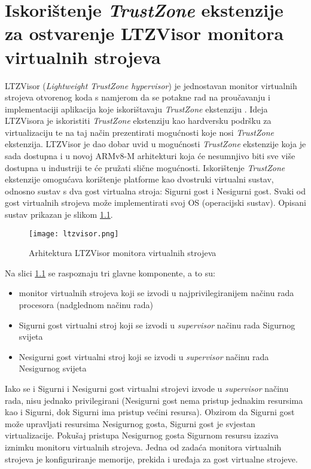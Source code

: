 \documentclass[times, utf8, diplomski, numeric]{fer}
\begin{document}
\chapter{Iskorištenje \textit{TrustZone} ekstenzije za ostvarenje LTZVisor monitora virtualnih strojeva}
LTZVisor (\textit{Lightweight TrustZone hypervisor}) je jednostavan monitor virtualnih strojeva otvorenog koda s namjerom
da se potakne rad na proučavanju i implementaciji aplikacija koje iskorištavaju \textit{TrustZone} ekstenziju \cite{ltzvisor}.
Ideja LTZVisora je iskoristiti \textit{TrustZone} ekstenziju kao hardversku podršku za virtualizaciju te na taj način
prezentirati mogućnosti koje nosi \textit{TrustZone} ekstenzija. LTZVisor je dao dobar uvid u mogućnosti \textit{TrustZone}
ekstenzije koja je sada dostupna i u novoj ARMv8-M arhitekturi koja će nesumnjivo biti sve više dostupna u industriji te
će pružati slične mogućnosti. Iskorištenje \textit{TrustZone} ekstenzije omogućava korištenje platforme kao dvostruki virtualni
sustav, odnosno sustav s dva gost virtualna stroja: Sigurni gost i Nesigurni gost. Svaki od gost virtualnih strojeva može
implementirati svoj OS (operacijski sustav). Opisani sustav prikazan je slikom \ref{ltzvisor}.
\begin{figure}[H]
  \centering
	\texttt{[image: ltzvisor.png]}%
	\caption{Arhitektura LTZVisor monitora virtualnih strojeva \cite{ltzvisor}}
	\label{ltzvisor}%
\end{figure}
Na slici \ref{ltzvisor} se raspoznaju tri glavne komponente, a to su:
\begin{itemize}
  \item{monitor virtualnih strojeva koji se izvodi u najprivilegiranijem načinu rada procesora (nadglednom načinu rada)}
  \item{Sigurni gost virtualni stroj koji se izvodi u \textit{supervisor} načinu rada Sigurnog svijeta}
  \item{Nesigurni gost virtualni stroj koji se izvodi u \textit{supervisor} načinu rada Nesigurnog svijeta}
\end{itemize}
Iako se i Sigurni i Nesigurni gost virtualni strojevi izvode u \textit{supervisor} načinu rada, nisu jednako privilegirani
(Nesigurni gost nema pristup jednakim resursima kao i Sigurni, dok Sigurni ima pristup većini resursa). Obzirom da
Sigurni gost može upravljati resursima Nesigurnog gosta, Sigurni gost je svjestan virtualizacije. Pokušaj pristupa Nesigurnog
gosta Sigurnom resursu izaziva iznimku monitoru virtualnih strojeva.
Jedna od zadaća monitora virtualnih strojeva je konfiguriranje memorije, prekida i uređaja za gost virtualne strojeve.
\end{document}
